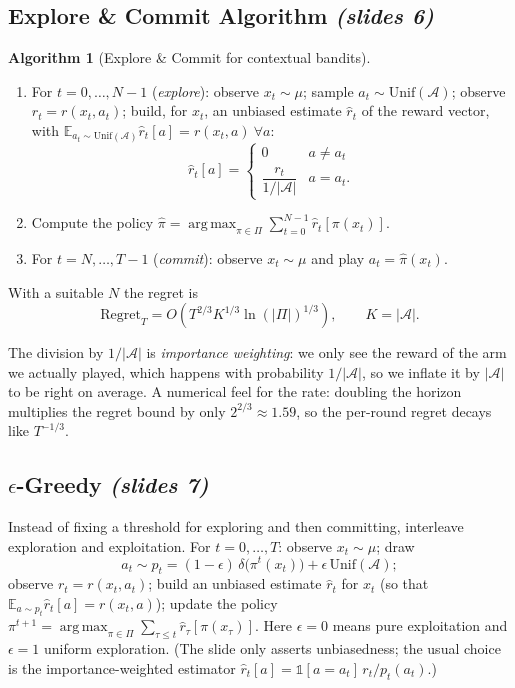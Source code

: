 \documentclass[11pt,a4paper]{article}
\newcommand{\E}{\mathbb{E}}
\newcommand{\cA}{\mathcal{A}}
\DeclareMathOperator*{\argmax}{arg\,max}
\newcommand{\slr}[1]{\texorpdfstring{\emph{(slides #1)}}{(slides #1)}}
\theoremstyle{plain}
\theoremstyle{definition}
\newtheorem{algorithm}[theorem]{Algorithm}
\theoremstyle{remark}
\begin{document}
\subsection{Explore \& Commit Algorithm \slr{6}}
\begin{algorithm}[Explore \& Commit for contextual bandits]
\begin{enumerate}[nosep]
  \item For $t=0,\dots,N-1$ (\emph{explore}): observe $x_t\sim\mu$; sample $a_t\sim\mathrm{Unif}(\cA)$; observe $r_t=r(x_t,a_t)$; build, for $x_t$, an unbiased estimate $\hat r_t$ of the reward vector, with $\E_{a_t\sim\mathrm{Unif}(\cA)}\hat r_t[a]=r(x_t,a)\ \forall a$:
  \[
   \hat r_t[a]=\begin{cases}0 & a\neq a_t\\[2pt] \dfrac{r_t}{1/|\cA|} & a=a_t.\end{cases}
  \]
  \item Compute the policy $\hat\pi=\argmax_{\pi\in\Pi}\sum_{t=0}^{N-1}\hat r_t[\pi(x_t)]$.
  \item For $t=N,\dots,T-1$ (\emph{commit}): observe $x_t\sim\mu$ and play $a_t=\hat\pi(x_t)$.
\end{enumerate}
\end{algorithm}
With a suitable $N$ the regret is
\[
  \mathrm{Regret}_T=O\!\left(T^{2/3}K^{1/3}\ln(|\Pi|)^{1/3}\right),\qquad K=|\cA|.
\]

\begin{intuition}
The division by $1/|\cA|$ is \emph{importance weighting}: we only see the reward of the arm we actually played, which happens with probability $1/|\cA|$, so we inflate it by $|\cA|$ to be right on average. A numerical feel for the rate: doubling the horizon multiplies the regret bound by only $2^{2/3}\approx1.59$, so the per-round regret decays like $T^{-1/3}$.
\end{intuition}

\subsection{\texorpdfstring{$\epsilon$}{epsilon}-Greedy \slr{7}}
Instead of fixing a threshold for exploring and then committing, interleave exploration and exploitation. For $t=0,\dots,T$: observe $x_t\sim\mu$; draw
\[
  a_t\sim p_t=(1-\epsilon)\,\delta\big(\pi^t(x_t)\big)+\epsilon\,\mathrm{Unif}(\cA);
\]
observe $r_t=r(x_t,a_t)$; build an unbiased estimate $\hat r_t$ for $x_t$ (so that $\E_{a\sim p_t}\hat r_t[a]=r(x_t,a)$); update the policy $\pi^{t+1}=\argmax_{\pi\in\Pi}\sum_{\tau\le t}\hat r_\tau[\pi(x_\tau)]$. Here $\epsilon=0$ means pure exploitation and $\epsilon=1$ uniform exploration. (The slide only asserts unbiasedness; the usual choice is the importance-weighted estimator $\hat r_t[a]=\mathbb 1[a=a_t]\,r_t/p_t(a_t)$.)
\end{document}
